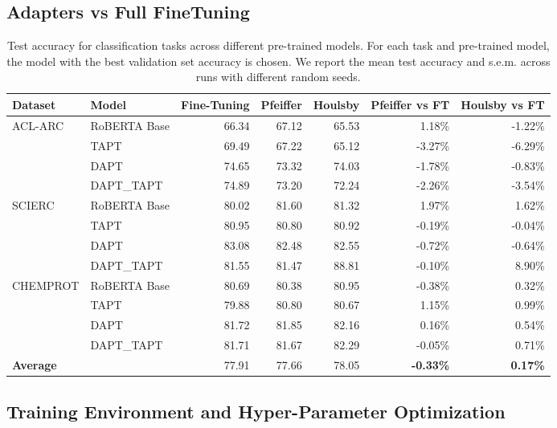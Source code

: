 \documentclass[10pt,twocolumn,letterpaper]{article}
\begin{document}
\subsection{Adapters vs Full FineTuning}
\begin{table}[h]
\centering

\begin{tabular}{llrrrrr}
\hline
\textbf{Dataset} & \textbf{Model} & \textbf{Fine-Tuning} & \textbf{Pfeiffer} & \textbf{Houlsby} & \textbf{Pfeiffer vs FT} & \textbf{Houlsby vs FT} \\
\hline
ACL-ARC & RoBERTA Base & 66.34 & 67.12 & 65.53 & 1.18\% & -1.22\% \\
& TAPT & 69.49 & 67.22 & 65.12 & -3.27\% & -6.29\% \\
& DAPT & 74.65 & 73.32 & 74.03 & -1.78\% & -0.83\% \\
& DAPT\_TAPT & 74.89 & 73.20 & 72.24 & -2.26\% & -3.54\% \\
\hline
SCIERC & RoBERTA Base & 80.02 & 81.60 & 81.32 & 1.97\% & 1.62\% \\
& TAPT & 80.95 & 80.80 & 80.92 & -0.19\% & -0.04\% \\
& DAPT & 83.08 & 82.48 & 82.55 & -0.72\% & -0.64\% \\
& DAPT\_TAPT & 81.55 & 81.47 & 88.81 & -0.10\% & 8.90\% \\
\hline
CHEMPROT & RoBERTA Base & 80.69 & 80.38 & 80.95 & -0.38\% & 0.32\% \\
& TAPT & 79.88 & 80.80 & 80.67 & 1.15\% & 0.99\% \\
& DAPT & 81.72 & 81.85 & 82.16 & 0.16\% & 0.54\% \\
& DAPT\_TAPT & 81.71 & 81.67 & 82.29 & -0.05\% & 0.71\% \\
\hline
\multicolumn{2}{l}{\textbf{Average}} & 77.91 & 77.66 & 78.05 & \textbf{-0.33\%} & \textbf{0.17\%} \\
\hline
\end{tabular}
\caption{Test accuracy for classification tasks across different pre-trained models. For each task and pre-trained model, the model with the best validation set accuracy is chosen. We report the mean test accuracy and s.e.m. across runs with
different random seeds.}
\label{table:adaptersvsft}
\end{table}
\FloatBarrier




\newpage{}
\subsection{Training Environment and Hyper-Parameter Optimization}
\label{sec:besthyperparameters}
\end{document}
